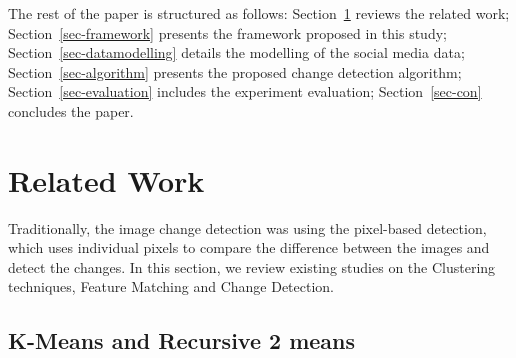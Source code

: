 \documentclass[runningheads,a4paper]{llncs}
\newcommand{\naoki}{\todo[author=NK,color=yellow,inline]}
\begin{document}
The rest of the paper is structured as follows:
Section~\ref{sec-bg} reviews the related work;
Section~\ref{sec-framework} presents the framework proposed in this study;
Section~\ref{sec-datamodelling} details the modelling of the social media data;
Section~\ref{sec-algorithm} presents the proposed change detection algorithm;
Section~\ref{sec-evaluation} includes the experiment evaluation;
Section~\ref{sec-con} concludes the paper. 

\section{Related Work}\label{sec-bg}
\naoki{edit}
Traditionally, the image change detection was using the pixel-based detection, which uses individual pixels to compare the difference between the images and detect the changes. 
In this section, we review existing studies on the Clustering techniques, Feature Matching and Change Detection. 



\subsection{K-Means and Recursive 2 means}
\end{document}

